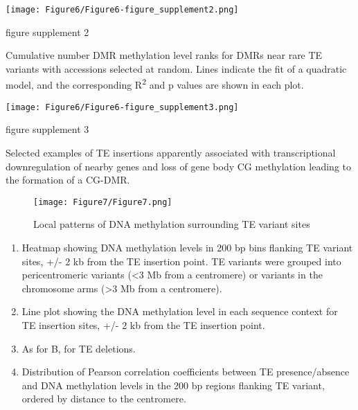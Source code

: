 \documentclass[12pt]{article}
\begin{document}
\pagebreak


\setcounter{suppfigure}{5}

\begin{suppfigure}
  \centering
  \texttt{[image: Figure6/Figure6-figure\_supplement2.png]}
  \caption{figure supplement 2}
  \label{fig6s2}
\end{suppfigure}

Cumulative number DMR methylation level ranks for DMRs near rare TE
variants with accessions selected at random. Lines indicate the fit of a
quadratic model, and the corresponding R\textsuperscript{2} and p values are shown in each
plot.

\pagebreak


\setcounter{suppfigure}{5}

\begin{suppfigure}
  \centering
  \texttt{[image: Figure6/Figure6-figure\_supplement3.png]}
  \caption{figure supplement 3}
  \label{fig6s3}
\end{suppfigure}

Selected examples of TE insertions apparently associated with
transcriptional downregulation of nearby genes and loss of gene body CG
methylation leading to the formation of a CG-DMR.

\pagebreak


\begin{figure}
  \centering
  \texttt{[image: Figure7/Figure7.png]}
  \caption{Local patterns of DNA methylation surrounding TE variant sites}
  \label{fig7}
\end{figure}

\begin{enumerate}
  \def\labelenumi{(\Alph{enumi})}
\item
  Heatmap showing DNA methylation levels in 200 bp bins flanking TE
  variant sites, +/- 2 kb from the TE insertion point. TE variants were
  grouped into pericentromeric variants (\textless{}3 Mb from a
  centromere) or variants in the chromosome arms (\textgreater{}3 Mb
  from a centromere).
\item
  Line plot showing the DNA methylation level in each sequence context
  for TE insertion sites, +/- 2 kb from the TE insertion point.
\item
  As for B, for TE deletions.
\item
  Distribution of Pearson correlation coefficients between TE
  presence/absence and DNA methylation levels in the 200 bp regions
  flanking TE variant, ordered by distance to the centromere.
\end{enumerate}
\end{document}
